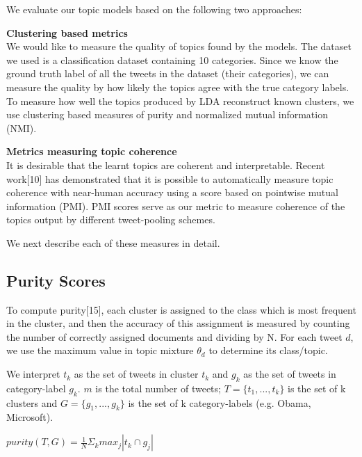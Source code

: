 \documentclass[10pt,a5paper,twoside]{article}
\begin{document}
We evaluate our topic models based on the following two approaches:
\begin{compactenum}
\item \textbf{Clustering based metrics} \\
We would like to measure the quality of topics found by the models. The dataset we used is a classification dataset containing 10 categories. Since we know the ground truth label of all the tweets in the dataset (their categories), we can measure the quality by how likely the topics agree with the true category labels. To measure how well the topics produced by LDA reconstruct known clusters, we use clustering based measures of purity and normalized mutual information (NMI).\\

\item \textbf{Metrics measuring topic coherence} \\
It is desirable that the learnt topics are coherent and interpretable. Recent work[10] has demonstrated that it is possible to automatically measure topic coherence with near-human accuracy using a score based on pointwise mutual information (PMI). PMI scores serve as our metric to measure coherence of the topics output by different tweet-pooling schemes.
\end{compactenum}

We next describe each of these measures in detail.


\subsection{Purity Scores}
To compute purity[15], each cluster is assigned to the class which is most frequent in the cluster, and then the accuracy of this assignment is measured by counting the number of correctly assigned documents and dividing by N. For each tweet $d$, we use the maximum value in topic mixture $\theta_{d} $ to determine its class/topic.

We interpret $t_{k}$ as the set of tweets in cluster $t_{k}$ and $g_{k}$ as the set of tweets in category-label $g_{k}$. $m$ is the total number of tweets; $T = \lbrace t_{1}, ... , t_{k} \rbrace$ is the set of k clusters and $ G = \lbrace g_{1}, ... , g_{k}\rbrace $ is the set of k category-labels (e.g. Obama, Microsoft).

\begin{center}
$ purity (T,G) = \frac{1}{N} \Sigma_{k} max_{j} |t_{k} \cap g_{j}|$
\end{center}
\end{document}
